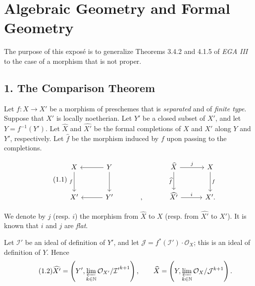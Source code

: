 \makeatletter
\providecommand{\sgareaderlabel}[2]{%
  \begingroup
  \def\@currentlabel{#2}%
  \phantomsection\label{#1}%
  \endgroup}
\makeatother

\chapter{Algebraic Geometry and Formal Geometry}
\label{IX}

\medskip
The purpose of this expos\'e is to generalize Theorems 3.4.2 and 4.1.5 of
\emph{EGA III} to the case of a morphism that is not proper.

\section*{1. The Comparison Theorem}
\sgareaderlabel{IX.1}{1}

Let $f\colon X\to X'$ be a morphism of preschemes that is
\emph{separated} and of \emph{finite type}. Suppose that $X'$ is locally
noetherian. Let $Y'$ be a closed subset of $X'$, and let
$Y=f^{-1}(Y')$. Let $\widehat X$ and $\widehat{X'}$ be the formal
completions of $X$ and $X'$ along $Y$ and $Y'$, respectively. Let
$\widehat f$ be the morphism induced by $f$ upon passing to the completions.

\begin{equation}
\tag{1.1}\label{eq:IX.1.1}
\begin{tikzcd}[column sep=3.1em,row sep=2.6em]
X \arrow[d,"f"'] & Y \arrow[l] \arrow[d] &&
\widehat{X} \arrow[d,"\widehat f"'] \arrow[r,"j"] & X \arrow[d,"f"] \\
X' & Y' \arrow[l] & {,} &
\widehat{X'} \arrow[r,"i"] & X'.
\end{tikzcd}
\end{equation}

We denote by $j$ (resp. $i$) the morphism from $\widehat X$ to $X$
(resp. from $\widehat{X'}$ to $X'$). It is known that $i$ and $j$ are
\emph{flat}.

Let $\mathcal I'$ be an ideal of definition of $Y'$, and let
$\mathcal J=f^*(\mathcal I')\cdot\mathcal O_X$; this is an ideal of
definition of $Y$. Hence
\begin{equation}
\tag{1.2}\label{eq:IX.1.2}
\widehat{X'}=
\left(Y',\varprojlim_{k\in\mathbb N}
\mathcal O_{X'}/{\mathcal I'}^{k+1}\right),
\qquad
\widehat X=
\left(Y,\varprojlim_{k\in\mathbb N}
\mathcal O_X/\mathcal J^{k+1}\right).
\end{equation}

